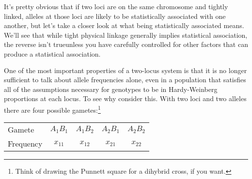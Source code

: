 It's pretty obvious that if two loci are on the same chromosome and
tightly linked, alleles at those loci are likely to be statistically
associated with one another, but let's take a closer look at what
being statistically associated means. We'll see that while tight
physical linkage generally implies statistical association, the
reverse isn't true{\dash}unless you have carefully controlled for
other factors that can produce a statistical association.

One of the most important properties of a two-locus system is that it
is no longer sufficient to talk about allele frequencies alone, even
in a population that satisfies all of the assumptions necessary for
genotypes to be in Hardy-Weinberg proportions at each locus. To see
why consider this. With two loci and two alleles there are four
possible gametes:\footnote{Think of drawing the Punnett square for a
  dihybrid cross, if you want.}

\begin{center}
\begin{tabular}{lcccc}
Gamete    & $A_1B_1$ & $A_1B_2$ & $A_2B_1$ & $A_2B_2$ \\
Frequency & $x_{11}$ & $x_{12}$ & $x_{21}$ & $x_{22}$
\end{tabular}
\end{center}

